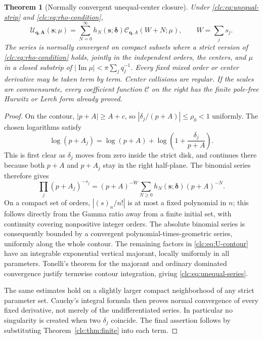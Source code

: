 \documentclass[11pt,a4paper]{article}
\numberwithin{equation}{section}
\newtheorem{theorem}{Theorem}[section]
\theoremstyle{definition}\newtheorem{definition}[theorem]{Definition}
\theoremstyle{remark}\newtheorem{remark}[theorem]{Remark}
\DeclareMathOperator{\Ima}{Im}
\newcommand{\bq}{\boldsymbol q}\newcommand{\bs}{\boldsymbol s}
\newcommand{\bA}{\boldsymbol A}\newcommand{\bdelta}{\boldsymbol\delta}
\newcommand{\CC}{\mathcal C}\newcommand{\UU}{\mathcal U}\newcommand{\EE}{\mathcal E}
\begin{document}
\begin{theorem}[Normally convergent unequal-center closure]
\label{clc:thm:unequal}
Under \eqref{clc:eq:unequal-strip} and \eqref{clc:eq:rho-condition},
\begin{equation}\label{clc:eq:unequal-series}
 \boxed{\displaystyle
 \UU_{\bq,\bA}(\bs;\mu)
 =\sum_{N=0}^\infty h_N(\bs;\bdelta)
                  \CC_{\bq,A}(W+N;\mu),\qquad W=\sum_js_j.}
\end{equation}
The series is normally convergent on compact subsets where a strict
version of \eqref{clc:eq:rho-condition} holds, jointly in the independent
orders, the centers, and $\mu$ in a closed substrip of
$|\Ima\mu|<\pi\sum_jq_j^{-1}$. Every fixed mixed order or center
derivative may be taken term by term. Center collisions are regular.
If the scales are commensurate, every coefficient function $\CC$ on the
right has the finite pole-free Hurwitz or Lerch form already proved.
\end{theorem}
\begin{proof}
On the contour, $|p+A|\ge A+c$, so
$|\delta_j/(p+A)|\le\rho_0<1$ uniformly. The chosen logarithms satisfy
\[
 \log(p+A_j)=\log(p+A)+
             \log\left(1+\frac{\delta_j}{p+A}\right).
\]
This is first clear as $\delta_j$ moves from zero inside the strict disk,
and continues there because both $p+A$ and $p+A_j$ stay in the right
half-plane. The binomial series therefore gives
\[
 \prod_j(p+A_j)^{-s_j}
 =(p+A)^{-W}\sum_{N\ge0}h_N(\bs;\bdelta)(p+A)^{-N}.
\]
On a compact set of orders, $|(s)_n/n!|$ is at most a fixed polynomial
in $n$; this follows directly from the Gamma ratio away from a finite
initial set, with continuity covering nonpositive integer orders.
The absolute binomial series is consequently bounded by a convergent
polynomial-times-geometric series, uniformly along the whole contour.
The remaining factors in \eqref{clc:eq:U-contour} have an integrable
exponential vertical majorant, locally uniformly in all parameters.
Tonelli's theorem for the majorant and ordinary dominated convergence
justify termwise contour integration, giving \eqref{clc:eq:unequal-series}.

The same estimates hold on a slightly larger compact neighborhood of
any strict parameter set. Cauchy's integral formula then proves normal
convergence of every fixed derivative, not merely of the undifferentiated
series. In particular no singularity is created when two $\delta_j$
coincide. The final assertion follows by substituting
Theorem~\ref{clc:thm:finite} into each term.
\end{proof}
\end{document}
